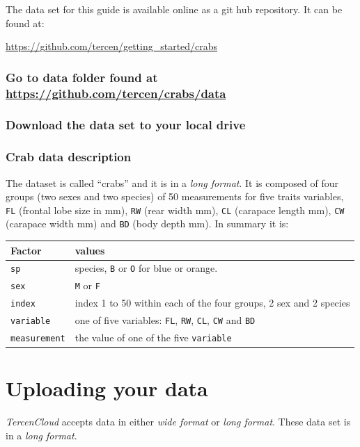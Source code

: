 \documentclass[]{book}
\theoremstyle{definition}
\theoremstyle{definition}
\theoremstyle{remark}
\begin{document}
The data set for this guide is available online as a git hub repository.
It can be found at:

\url{https://github.com/tercen/getting_started/crabs}

\subsubsection{\texorpdfstring{Go to data folder found at
\url{https://github.com/tercen/crabs/data}}{Go to data folder found at https://github.com/tercen/crabs/data}}\label{go-to-data-folder-found-at-httpsgithub.comtercencrabsdata}

\subsubsection{Download the data set to your local
drive}\label{download-the-data-set-to-your-local-drive}

\subsubsection{Crab data description}\label{crab-data-description}

The dataset is called ``crabs'' and it is in a \emph{long format}. It is
composed of four groups (two sexes and two species) of 50 measurements
for five traits variables, \texttt{FL} (frontal lobe size in mm),
\texttt{RW} (rear width mm), \texttt{CL} (carapace length mm),
\texttt{CW} (carapace width mm) and \texttt{BD} (body depth mm). In
summary it is:

\begin{longtable}[]{@{}ll@{}}
\toprule
Factor & values\tabularnewline
\midrule
\endhead
\texttt{sp} & species, \texttt{B} or \texttt{O} for blue or
orange.\tabularnewline
\texttt{sex} & \texttt{M} or \texttt{F}\tabularnewline
\texttt{index} & index 1 to 50 within each of the four groups, 2 sex and
2 species\tabularnewline
\texttt{variable} & one of five variables: \texttt{FL}, \texttt{RW},
\texttt{CL}, \texttt{CW} and \texttt{BD}\tabularnewline
\texttt{measurement} & the value of one of the five
\texttt{variable}\tabularnewline
\bottomrule
\end{longtable}

\section{Uploading your data}\label{uploading-your-data}

\emph{TercenCloud} accepts data in either \emph{wide format} or
\emph{long format}. These data set is in a \emph{long format}.
\end{document}
